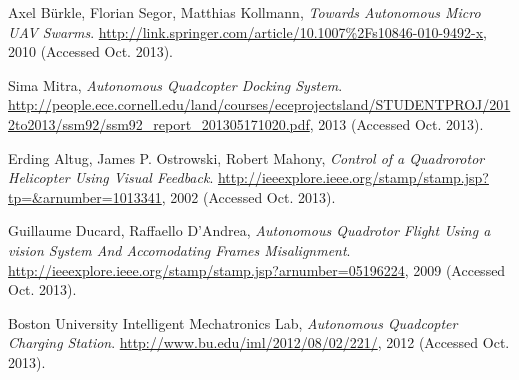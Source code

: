   Axel Bürkle, Florian Segor, Matthias Kollmann,
  \emph{Towards Autonomous Micro UAV Swarms}.
  \url{http://link.springer.com/article/10.1007%2Fs10846-010-9492-x},
  2010 (Accessed Oct. 2013).

  Sima Mitra,
  \emph{Autonomous Quadcopter Docking System}.
  \url{http://people.ece.cornell.edu/land/courses/eceprojectsland/STUDENTPROJ/2012to2013/ssm92/ssm92_report_201305171020.pdf},
   2013 (Accessed Oct. 2013).

  Erding Altug, James P. Ostrowski, Robert Mahony,
  \emph{Control of a Quadrorotor Helicopter Using Visual Feedback}.
  \url{http://ieeexplore.ieee.org/stamp/stamp.jsp?tp=&arnumber=1013341},
   2002 (Accessed Oct. 2013).

  Guillaume Ducard, Raffaello D'Andrea,
  \emph{Autonomous Quadrotor Flight Using a vision System And Accomodating Frames Misalignment}.
  \url{http://ieeexplore.ieee.org/stamp/stamp.jsp?arnumber=05196224},
   2009 (Accessed Oct. 2013).

  Boston University Intelligent Mechatronics Lab, 
  \emph{Autonomous Quadcopter Charging Station}.
  \url{http://www.bu.edu/iml/2012/08/02/221/}, 
  2012 (Accessed Oct. 2013).

\bibitem{} %